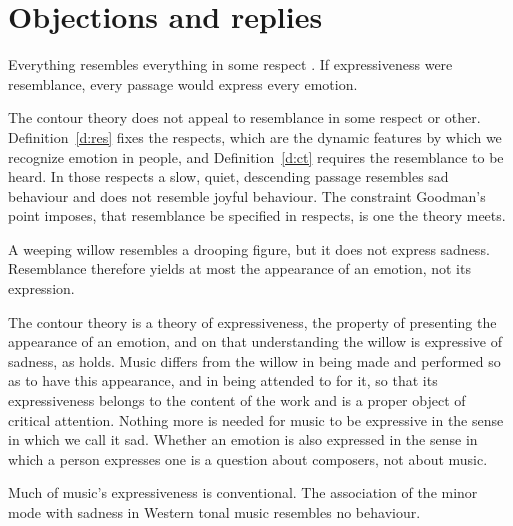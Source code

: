\documentclass{situationist-preprint}
\begin{document}
\section{Objections and replies}

\begin{objection}\label{o:cheap}
Everything resembles everything in some respect \citep{Goodman1970}. If expressiveness were resemblance, every passage would express every emotion.
\end{objection}

\begin{reply}
The contour theory does not appeal to resemblance in some respect or other. Definition~\ref{d:res} fixes the respects, which are the dynamic features by which we recognize emotion in people, and Definition~\ref{d:ct} requires the resemblance to be heard. In those respects a slow, quiet, descending passage resembles sad behaviour and does not resemble joyful behaviour. The constraint Goodman's point imposes, that resemblance be specified in respects, is one the theory meets.
\end{reply}

\begin{objection}[Willows]\label{o:willow}
A weeping willow resembles a drooping figure, but it does not express sadness. Resemblance therefore yields at most the appearance of an emotion, not its expression.
\end{objection}

\begin{reply}
The contour theory is a theory of expressiveness, the property of presenting the appearance of an emotion, and on that understanding the willow is expressive of sadness, as \citet{SDavies1994} holds. Music differs from the willow in being made and performed so as to have this appearance, and in being attended to for it, so that its expressiveness belongs to the content of the work and is a proper object of critical attention. Nothing more is needed for music to be expressive in the sense in which we call it sad. Whether an emotion is also expressed in the sense in which a person expresses one is a question about composers, not about music.
\end{reply}

\begin{objection}[Conventions]\label{o:conv}
Much of music's expressiveness is conventional. The association of the minor mode with sadness in Western tonal music resembles no behaviour.
\end{objection}
\end{document}
